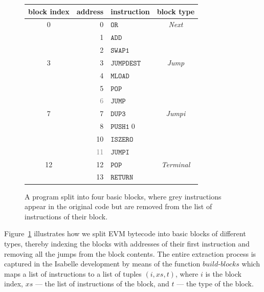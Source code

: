 \documentclass[sigplan,10pt,review]{acmart}\settopmatter{printfolios=true,printccs=false,printacmref=false}
\newcommand{\instr}[1]{\mathtt{#1}}
\newcommand{\bblocks}{\mathit{build\mbox{-}blocks}}
\begin{document}
\begin{figure}[ht!]
\begin{tabular}{c | r l | c}
                block index & address & instruction & block type\\
                        \hline
                {0}&       0       &       $\instr{OR}$&\textit{Next}\\
                &       1       &       $\instr{ADD}$&\\
                &    2       &       $\instr{SWAP1}$&  \\
                        \hline
                {3}&       3       &       $\instr{JUMPDEST}$&\textit{Jump}\\
                &       4       &       $\instr{MLOAD}$&\\
                &       5       &       $\instr{POP}$&\\
                &    \textcolor{gray}{6}     &       {\color{gray}$\instr{JUMP}$}& \\
                        \hline
                {7}&       7       &       $\instr{DUP3}$&\textit{Jumpi}\\
                &       8       &       $\instr{PUSH1}\;0$&\\
                &       10      &       $\instr{ISZERO}$&\\
                &    \textcolor{gray}{11}    &       {\color{gray}$\instr{JUMPI}$}& \\
                        \hline
                {12}&       12      &       $\instr{POP}$&\textit{Terminal}\\
                &   13      &       $\instr{RETURN}$& \\
                        \hline
        \end{tabular}
\caption{A program split into four basic blocks, where grey instructions appear in the original
         code but are removed from the list of instructions of their block.}
\label{fig:basicblocks}
\end{figure}
Figure~\ref{fig:basicblocks} illustrates how we split EVM bytecode into basic blocks of different
types, thereby indexing the blocks with addresses of their first instruction
and removing all the jumps from the block contents. %
The entire extraction process is captured in the Isabelle development
by means of the function $\bblocks$ which maps a list of instructions to a list of tuples $(i, \mathit{xs}, t)$,
where $i$ is the block index, $\mathit{xs}$ --- the list of instructions of the block, and $t$ --- the type of
the block. 
\end{document}
